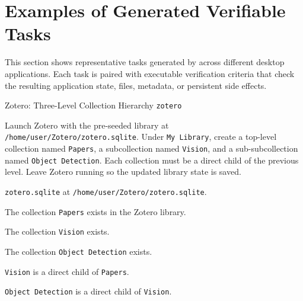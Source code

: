 \section{Examples of Generated Verifiable Tasks}
\label{app:generated-task-examples}

This section shows representative tasks generated by \ours across different
desktop applications. Each task is paired with executable verification criteria
that check the resulting application state, files, metadata, or persistent side
effects.

\begin{taskexample}{Zotero: Three-Level Collection Hierarchy}
 \texttt{zotero}

 Launch Zotero with the pre-seeded library at
\texttt{/home/user/Zotero/zotero.sqlite}. Under \texttt{My Library}, create a
top-level collection named \texttt{Papers}, a subcollection named
\texttt{Vision}, and a sub-subcollection named \texttt{Object Detection}.
Each collection must be a direct child of the previous level. Leave Zotero
running so the updated library state is saved.

\texttt{zotero.sqlite} at \texttt{/home/user/Zotero/zotero.sqlite}.

\begin{compactitem}
    \item The collection \texttt{Papers} exists in the Zotero library.
    \item The collection \texttt{Vision} exists.
    \item The collection \texttt{Object Detection} exists.
    \item \texttt{Vision} is a direct child of \texttt{Papers}.
    \item \texttt{Object Detection} is a direct child of \texttt{Vision}.
\end{compactitem}
\end{taskexample}


